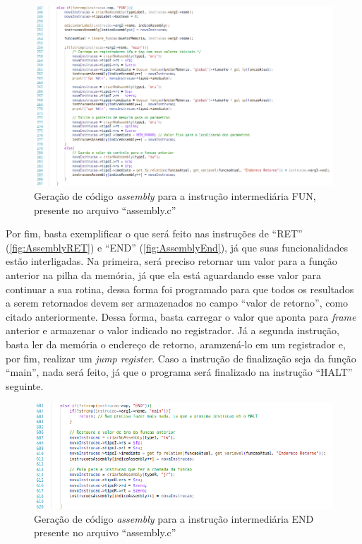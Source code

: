 \documentclass[
	12pt,				%
	oneside,
	a4paper,			%
	english,			%
	french,				%
	spanish,			%
	brazil,				%
	]{abntex2}
\begin{document}
\begin{figure}[H]
\centering 
\caption{Geração de código \emph{assembly} para a instrução intermediária FUN, presente no arquivo ``assembly.c''} \label{fig:AssemblyFUN}
\graphicspath{ {./imgs/} } 
\includegraphics[scale=0.4]{imgs/Codigo/Cod_Assembly_Fun.png}
\end{figure}


Por fim, basta exemplificar o que será feito nas instruções de ``RET'' (\autoref{fig:AssemblyRET}) e ``END'' (\autoref{fig:AssemblyEnd}), já que suas funcionalidades estão interligadas. Na primeira, será preciso retornar um valor para a função anterior na pilha da memória, já que ela está aguardando esse valor para continuar a sua rotina, dessa forma foi programado para que todos os resultados a serem retornados devem ser armazenados no campo ``valor de retorno'', como citado anteriormente. Dessa forma, basta carregar o valor que aponta para \emph{frame} anterior e armazenar o valor indicado no registrador. Já a segunda instrução, basta ler da memória o endereço de retorno, aramzená-lo em um registrador e, por fim, realizar um \emph{jump register}. Caso a instrução de finalização seja da função ``main'', nada será feito, já que o programa será finalizado na instrução ``HALT'' seguinte.

\begin{figure}[H]
\centering 
\caption{Geração de código \emph{assembly} para a instrução intermediária END presente no arquivo ``assembly.c''} \label{fig:AssemblyEnd}
\graphicspath{ {./imgs/} } 
\includegraphics[scale=0.4]{imgs/Codigo/Cod_Assembly_End.png}
\end{figure}
\end{document}
